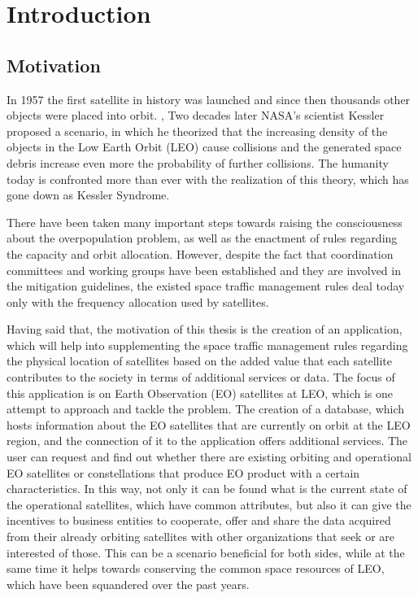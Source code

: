\chapter{Introduction}
\label{chap:1}

\section{Motivation}
\label{chap:1.1}
\bigskip
\bigskip

In 1957 the first satellite in history was launched and since then thousands other objects were placed into orbit. \cite{Belward 2015}, \cite{ESA 2020} Two decades later NASA’s scientist Kessler proposed a scenario, in which he theorized that the increasing density of the objects in the Low Earth Orbit (LEO) cause collisions and the generated space debris increase even more the probability of further collisions. The humanity today is confronted more than ever with the realization of this theory, which has gone down as Kessler Syndrome.

There have been taken many important steps towards raising the consciousness about the overpopulation problem, as well as the enactment of rules regarding the capacity and orbit allocation. However, despite the fact that coordination committees and working groups have been established and they are involved in the mitigation guidelines, the existed space traffic management rules deal today only with the frequency allocation used by satellites. \cite{Griffin} %

Having said that, the motivation of this thesis is the creation of an application, which will help into supplementing the space traffic management rules regarding the physical location of satellites based on the added value that each satellite contributes to the society in terms of additional services or data. The focus of this application is on Earth Observation (EO) satellites at LEO, which is one attempt to approach and tackle the problem. The creation of a database, which hosts information about the EO satellites that are currently on orbit at the LEO region, and the connection of it to the application offers additional services. The user can request and find out whether there are existing orbiting and operational EO satellites or constellations that produce EO product with a certain characteristics. In this way, not only it can be found what is the current state of the operational satellites, which have common attributes, %
but also it can give the incentives to business entities %
to cooperate, offer and share the data acquired from their already orbiting satellites with other organizations that seek or are interested of those. This can be a scenario beneficial for both sides, while at the same time it helps towards conserving the common space resources of LEO, which have been squandered over the past years.  

